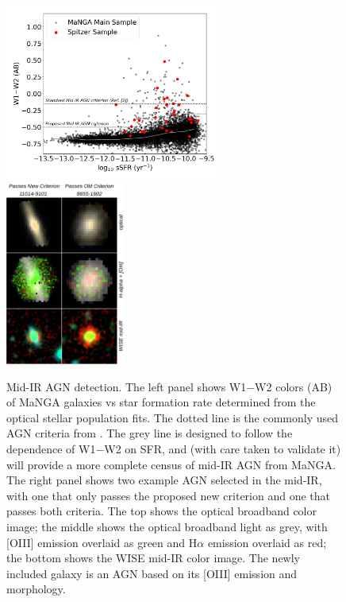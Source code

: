 \documentclass[12pt, preprint]{hacked-aastex}
\begin{document}
\begin{figure}[t!]
\includegraphics[width=0.64\textwidth]{w1w2-vs-ssfr.png}
\includegraphics[width=0.35\textwidth]{ir-grid.drawio.png}
  \vspace{-22pt}
    \caption{
\label{fig:wise} \small Mid-IR AGN detection. 
The left panel shows W1$-$W2 colors (AB) of MaNGA galaxies vs star
formation rate determined from the optical stellar population fits.
The dotted line is the commonly used AGN criteria from
\cite{assef18a}. The grey line is designed to follow the dependence of
W1$-$W2 on SFR, and (with care taken to validate it) will provide a
more complete census of mid-IR AGN from MaNGA. The right panel shows
two example AGN selected in the mid-IR, with one that only passes the
proposed new criterion and one that passes both criteria. The top
shows the optical broadband color image; the middle shows the optical
broadband light as grey, with [OIII] emission overlaid as green and
H$\alpha$ emission overlaid as red; the bottom shows the WISE mid-IR
color image. The newly included galaxy is an AGN based on its [OIII]
emission and morphology.}
\end{figure}
\end{document}
